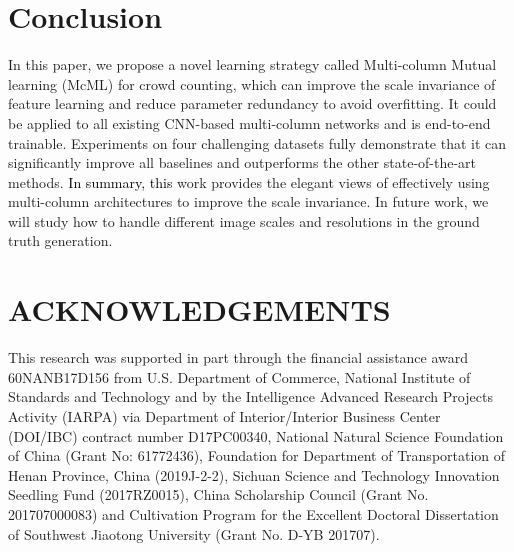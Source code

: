 \documentclass[sigconf]{acmart}
\newcommand{\czq}[1]{\textcolor{black}{#1}}
\begin{document}
\vspace{-1mm}
\section{Conclusion}
\label{sec:conclusion}
In this paper, we propose a novel learning strategy called Multi-column Mutual learning (McML) for crowd counting, which can improve the scale invariance of feature learning and reduce parameter redundancy to avoid overfitting.
It could be applied to all existing CNN-based multi-column networks and is end-to-end trainable. 
Experiments on four challenging datasets fully demonstrate that it can significantly improve all baselines and outperforms the other state-of-the-art methods.
\czq{In summary, this} work provides the elegant views of effectively using multi-column architectures to improve the scale invariance.
In future work, we will study how to handle different image scales and resolutions in the ground truth generation.

\vspace{-1mm}
\section{ACKNOWLEDGEMENTS}

{\small This research was supported in part through the financial assistance award 60NANB17D156 from U.S. Department of Commerce, National Institute of Standards and Technology and by the Intelligence Advanced Research Projects Activity (IARPA) via Department of Interior/Interior Business Center (DOI/IBC) contract number D17PC00340, National Natural Science Foundation of China (Grant No: 61772436), Foundation for Department of Transportation of Henan Province, China (2019J-2-2), Sichuan Science and Technology Innovation Seedling Fund (2017RZ0015), China Scholarship Council (Grant No. 201707000083) and Cultivation Program for the Excellent Doctoral Dissertation of Southwest Jiaotong University (Grant No. D-YB 201707).}

\clearpage



\end{document}
